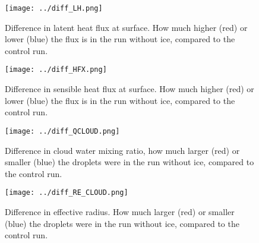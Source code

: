 \begin{figure}
\centering
\texttt{[image: ../diff\_LH.png]}
\caption{Difference in latent heat flux at surface. How much higher (red) or lower (blue) the flux is in the run without ice, compared to the control run.}
\label{fig:lh}
\end{figure}

\begin{figure}
\centering
\texttt{[image: ../diff\_HFX.png]}
\caption{Difference in sensible heat flux at surface. How much higher (red) or lower (blue) the flux is in the run without ice, compared to the control run.}
\label{fig:hfx}
\end{figure}

\begin{figure}
\centering
\texttt{[image: ../diff\_QCLOUD.png]}
\caption{Difference in cloud water mixing ratio, how much larger (red) or smaller (blue) the droplets were in the run without ice, compared to the control run.}
\label{fig:qcloud}
\end{figure}

\begin{figure}
\centering
\texttt{[image: ../diff\_RE\_CLOUD.png]}
\caption{Difference in effective radius. How much larger (red) or smaller (blue) the droplets were in the run without ice, compared to the control run.}
\label{fig:re_cloud}
\end{figure}






